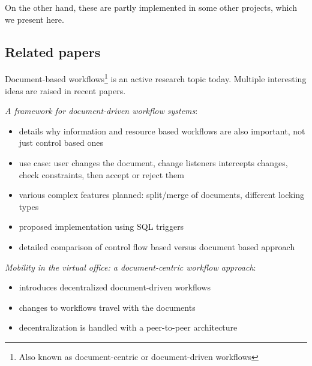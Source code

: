 On the other hand, these are partly implemented in some other projects, which we present here.

\subsection*{Related papers}

Document-based workflows\footnote{Also known as document-centric or
document-driven workflows} is an active research topic today. Multiple
interesting ideas are raised in recent papers.

\emph{A framework for document-driven workflow systems}\cite{paper-framework}:
\begin{itemize}
\item details why information and resource based workflows are also important, not just control based ones
\item use case: user changes the document, change listeners intercepts changes, check constraints, then accept or reject them
\item various complex features planned: split/merge of documents, different locking types
\item proposed implementation using SQL triggers
\item detailed comparison of control flow based versus document based approach
\end{itemize}

\emph{Mobility in the virtual office: a document-centric workflow approach}\cite{paper-mobility}:
\begin{itemize}
\item introduces decentralized document-driven workflows
\item changes to workflows travel with the documents
\item decentralization is handled with a peer-to-peer architecture
\end{itemize}
